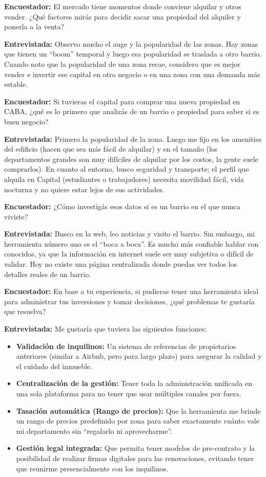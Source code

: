 \textbf{Encuestador:} El mercado tiene momentos donde conviene alquilar y otros vender. ¿Qué factores mirás para decidir sacar una propiedad del alquiler y ponerla a la venta?

\textbf{Entrevistada:} Observo mucho el auge y la popularidad de las zonas. Hay zonas que tienen un ``boom'' temporal y luego esa popularidad se traslada a otro barrio. Cuando noto que la popularidad de una zona recae, considero que es mejor vender e invertir ese capital en otro negocio o en una zona con una demanda más estable.

\textbf{Encuestador:} Si tuvieras el capital para comprar una nueva propiedad en CABA, ¿qué es lo primero que analizás de un barrio o propiedad para saber si es buen negocio?

\textbf{Entrevistada:} Primero la popularidad de la zona. Luego me fijo en los amenities del edificio (hacen que sea más fácil de alquilar) y en el tamaño (los departamentos grandes son muy difíciles de alquilar por los costos, la gente suele comprarlos). En cuanto al entorno, busco seguridad y transporte; el perfil que alquila en Capital (estudiantes o trabajadores) necesita movilidad fácil, vida nocturna y no quiere estar lejos de sus actividades.

\textbf{Encuestador:} ¿Cómo investigás esos datos si es un barrio en el que nunca viviste?

\textbf{Entrevistada:} Busco en la web, leo noticias y visito el barrio. Sin embargo, mi herramienta número uno es el ``boca a boca''. Es mucho más confiable hablar con conocidos, ya que la información en internet suele ser muy subjetiva o difícil de validar. Hoy no existe una página centralizada donde puedas ver todos los detalles reales de un barrio.

\textbf{Encuestador:} En base a tu experiencia, si pudieras tener una herramienta ideal para administrar tus inversiones y tomar decisiones, ¿qué problemas te gustaría que resuelva?

\textbf{Entrevistada:} Me gustaría que tuviera las siguientes funciones:

\begin{itemize}
\item \textbf{Validación de inquilinos:} Un sistema de referencias de propietarios anteriores (similar a Airbnb, pero para largo plazo) para asegurar la calidad y el cuidado del inmueble.
\item \textbf{Centralización de la gestión:} Tener toda la administración unificada en una sola plataforma para no tener que usar múltiples canales por fuera.
\item \textbf{Tasación automática (Rango de precios):} Que la herramienta me brinde un rango de precios predefinido por zona para saber exactamente cuánto vale mi departamento sin ``regalarlo ni aprovecharme''.
\item \textbf{Gestión legal integrada:} Que permita tener modelos de pre-contrato y la posibilidad de realizar firmas digitales para las renovaciones, evitando tener que reunirme presencialmente con los inquilinos.
\end{itemize}

